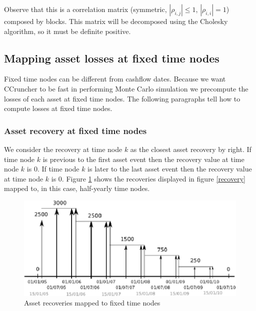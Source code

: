 \documentclass[a4paper,12pt,final]{article}
\begin{document}
Observe that this is a correlation matrix (symmetric, $|\rho_{i,j}| \leq 1$, 
$|\rho_{i,i}| = 1$) composed by blocks. This matrix will be decomposed using 
the Cholesky algorithm, so it must be definite positive.

\subsection{Mapping asset losses at fixed time nodes}
Fixed time nodes can be different from cashflow dates. Because we want CCruncher 
to be fast in performing Monte Carlo simulation we precompute the losses of each 
asset at fixed time nodes. The following paragraphs tell how to compute losses at 
fixed time nodes.

\subsubsection{Asset recovery at fixed time nodes}
We consider the recovery at time node $k$ as the closest asset recovery by 
right. If time node $k$ is previous to the first asset event then the recovery 
value at time node $k$ is $0$. If time node $k$ is later to the last asset event 
then the recovery value at time node $k$ is $0$. Figure \ref{recoverymapping} 
shows the recoveries displayed in figure \ref{recovery} mapped to, in this case,
half-yearly time nodes.

\begin{figure}[!hbtp]
\begin{center}
\includegraphics[width=12cm, angle=0]{./images/recoverymapping.eps}
\caption{Asset recoveries mapped to fixed time nodes}
\label{recoverymapping}
\end{center}
\end{figure}
\FloatBarrier

\end{document}
